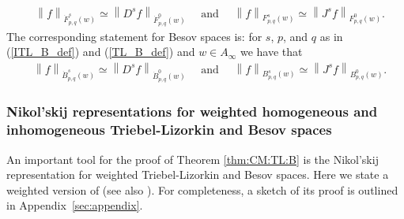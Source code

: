 \documentclass[10pt,a4paper]{article}
\theoremstyle{remark}
\newcommand{\tlw}[4]{\dot F_{#1,#3}^{#2}(#4)} %
\newcommand{\itlw}[4]{F_{#1,#3}^{#2}(#4)} %
\newcommand{\besw}[4]{\dot B_{#1,#3}^{#2}(#4)} %
\newcommand{\ibesw}[4]{B_{#1,#3}^{#2}(#4)} %
\newcommand{\norm}[2]{\left\|#1\right\|_{#2}}
\begin{document}
 \begin{align*}
 & \norm{f}{\tlw{p}{s}{q}{w}}\simeq\norm{D^s f}{\tlw{p}{0}{q}{w}} \quad \text{ and } \quad \norm{f}{\itlw{p}{s}{q}{w}}\simeq\norm{J^s f}{\itlw{p}{0}{q}{w}}.
 \end{align*}
The corresponding statement for Besov spaces is: for $s$, $p$, and $q$ as in (\ref{ITL_B_def}) and (\ref{TL_B_def}) and $w\in A_\infty$ we have that 
 \begin{align*}
 & \norm{f}{\besw{p}{s}{q}{w}}\simeq\norm{D^s f}{\besw{p}{0}{q}{w}} \quad \text{ and } \quad \norm{f}{\ibesw{p}{s}{q}{w}}\simeq\norm{J^s f}{\ibesw{p}{0}{q}{w}}.
 \end{align*}
 

  

\subsubsection{Nikol'skij representations for weighted homogeneous and inhomogeneous Triebel-Lizorkin and Besov spaces}

An important tool for the proof of Theorem \ref{thm:CM:TL:B} is the Nikol'skij representation for weighted Triebel-Lizorkin and Besov spaces. Here we state a weighted version of \cite[Theorem 3.7]{MR837335} (see also \cite[Section 2.5.2]{MR3024598}). 
For  completeness, a sketch of its proof is outlined in Appendix~\ref{sec:appendix}.
\end{document}
